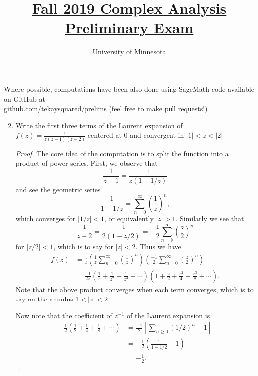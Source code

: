 \documentclass{article}
\title{\href{https://math.umn.edu/sites/math.umn.edu/files/exams/complexf19.pdf}{Fall 2019 Complex Analysis Preliminary Exam}}
\author{University of Minnesota}
\date{}
\begin{document}
\maketitle

Where possible, computations have been also done using SageMath code available on GitHub at \\ github.com/tekaysquared/prelims (feel free to make pull requests!)

\begin{enumerate}


	\setcounter{enumi}{1}
	
	\item Write the first three terms of the Laurent expansion of $\displaystyle f(z) = \frac{1}{z(z-1)(z-2)}$ centered at $0$ and convergent in $|1| < z < |2|$
	
	\begin{proof}
		The core idea of the computation is to split the function into a product of power series.
		First, we observe that 
		\[ \frac{1}{z-1} = \frac{1}{z(1-1/z)}\] 
		and see the geometric series 
		\[ \frac{1}{1-1/z} = \sum_{n=0}^\infty \left( \frac{1}{z} \right)^n,\]
		which converges for $|1/z| < 1$, or equivalently $|z|>1$.
		Similarly we see that 
		\[ \frac{1}{z-2} = \frac{-1}{2(1-z/2)} = -\frac{1}{2} \sum_{n=0}^\infty \left ( \frac{z}{2} \right )^n \]
		for $|z/2| < 1$, which is to say for $|z|< 2$.
		Thus we have
		\begin{align*}
			f(z) &= \frac{1}{z} \left ( \frac{1}{z} \sum_{n=0}^\infty \left ( \frac{1}{z} \right )^n \right ) \left ( \frac{-1}{2} \sum_{n=0}^\infty \left( \frac{z}{2} \right)^n \right )\\
			&= \frac{-1}{2z} \left (\frac{1}{z} + \frac{1}{z^2} + \frac{1}{z^3} + \cdots  \right) \left ( 1 + \frac{z}{2}+\frac{z^2}{4}+\frac{z^3}{8}+\cdots \right ).
		\end{align*}
		Note that the above product converges when each term converges, which is to say on the annulus $1 < |z| < 2$.
	
		Now note that the coefficient of 	$z^{-1}$ of the Laurent expansion is 
		\begin{align*}
			- \frac{1}{2} \left ( \frac{1}{2} + \frac{1}{4} +\frac{1}{8} + \cdots \right ) &=  \frac{-1}{2} \left [ \sum_{n \geq 0} (1/2)^n - 1\right ] \\
			&= -\frac{1}{2} \left (\frac{1}{1-1/2} - 1 \right)\\
			&= -\frac{1}{2}.
		\end{align*}
		

\end{proof}
\end{enumerate}
\end{document}
